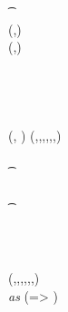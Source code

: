 \begin{figure}
\begin{center}
{\begin{varwidth}{\textwidth}
{            \t \pcreturn \cnstFalsum \\
            (\funStar{\varBlindingFactorBob},\varNonceBob) \sample \cnstIntegersPrimeWithoutZero{\varPrime} \\
            (\varCoinOutBob,\varProofBob) \opFunResult \procCreateCoin{\varFundValue}{\funStar{\varBlindingFactorBob}} \\
            \varSecKeyBob \opAssign \funStar{\varBlindingFactorBob} \\
            \varSigContext \opFunResult \procSetupCtx{\varSigContext}{\funGen{\varSecKeyBob}}{\funGen{\varNonceBob}} \\
            \varSigBob \opFunResult {} \\
            \varPreTx \opFunResult \procCreatePreTx{\varMsg}{\varInputs}{\varOutputs \opConc \varCoinOutBob}{\varProofs \opConc \varProofBob}{\varSigContext}{\varCommits \opConc \funGen{\varSecKeyBob}}{\varSigBob}{\cnstFalsum} \\
            \pcreturn (\varPreTx, \funStar{\varBlindingFactorBob})
            }
            \procedure[linenumbering]{$\procFinTx{\varPreTx}{\varSecKeyAlice}{\varNonceAlice}{\varTime}$} {
            (\varMsg,\varInputs,\varOutputs,\varProofs,\varSigContext,\varCommits,\varSigBob) \opFunResult \varPreTx \\
            \pcif \procVerfProof{\varProofs[1]}{\varOutputs[1]}  \\
            \t \pcreturn \cnstFalsum \\
            \pcif \procVerfPtSig{\varSigBob}{\varMsg}{\varCommits[1]}  \\
            \t \pcreturn \cnstFalsum \\
            \varSigAlice \opFunResult \procSignPrt{\varMsg}{\varSecKeyAlice}{\varNonceAlice}{\varSigContext} \\
            \varSigFin \opFunResult \procFinSig{\varSigAlice}{\varSigBob} \\
            \varTx \opFunResult \procCreatePreTx{\varMsg}{\varInputs}{\varOutputs}{\varProofs}{\varSigContext}{\varCommits}{\varSigFin}{\cnstFalsum} \\
            \pcreturn \varTx
            }
            \procedure[linenumbering]{$\procVerfTx{\varTx}$} {
            (\varMsg,\varInputs,\varOutputs,\varProofs,\varSigContext,\varCommits,\varSignature) \opFunResult \varTx \\
            \pcforeach \varOutputs \textit{ as } (\varIterator => \varCoinOut) \\
}
\end{varwidth}}
\end{center}
\end{figure}
